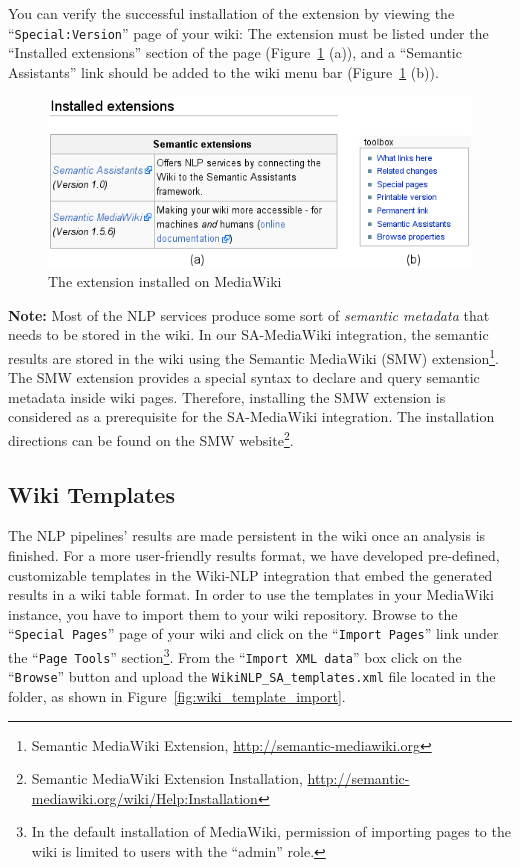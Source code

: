 You can verify the successful installation of the \sa extension by viewing the ``\texttt{Special:Version}'' page of your wiki: The \sa extension must be listed under the ``Installed extensions'' section of the page (Figure~\ref{fig:semassist_plugin} (a)), and a ``Semantic Assistants'' link should be added to the wiki menu bar (Figure~\ref{fig:semassist_plugin} (b)).

\begin{figure}
\centering
\includegraphics[scale=0.8]{pictures/semassist_plugin.png}
\caption{The \sa extension installed on MediaWiki}
\label{fig:semassist_plugin}
\end{figure}

\blankline
\noindent
\textbf{Note:} Most of the NLP services produce some sort of \emph{semantic metadata} that needs to be stored in the wiki. In our SA-MediaWiki integration, the semantic results are stored in the wiki using the Semantic MediaWiki (SMW) extension\footnote{Semantic MediaWiki Extension, \url{http://semantic-mediawiki.org}}. The SMW extension provides a special syntax to declare and query semantic metadata inside wiki pages. Therefore, installing the SMW extension is considered as a prerequisite for the SA-MediaWiki integration. The installation directions can be found on the SMW website\footnote{Semantic MediaWiki Extension Installation, \url{http://semantic-mediawiki.org/wiki/Help:Installation}}.

\subsection{Wiki Templates}
The NLP pipelines' results are made persistent in the wiki once an analysis is finished. For a more user-friendly results format, we have developed pre-defined, customizable templates in the Wiki-NLP integration that embed the generated results in a wiki table format. In order to use the templates in your MediaWiki instance, you have to import them to your wiki repository. Browse to the ``\texttt{Special Pages}'' page of your wiki and click on the ``\texttt{Import Pages}'' link under the ``\texttt{Page Tools}'' section\footnote{In the default installation of MediaWiki, permission of importing pages to the wiki is limited to users with the ``admin'' role.}. From the ``\texttt{Import XML data}'' box click on the ``\texttt{Browse}'' button and upload the \texttt{WikiNLP\_SA\_templates.xml} file located in the  folder, as shown in Figure~\ref{fig:wiki_template_import}.

